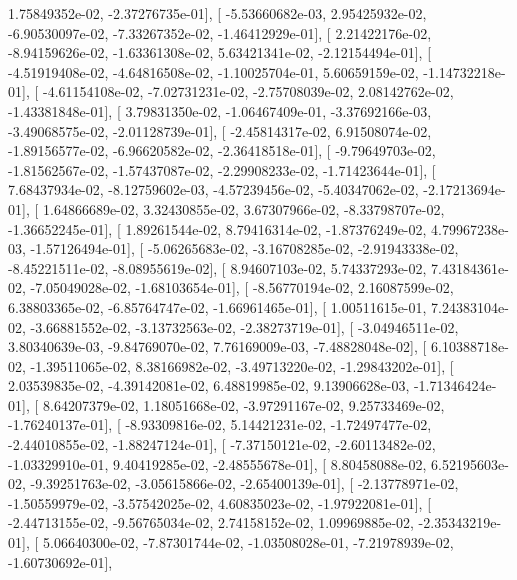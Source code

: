 \documentclass{article}
\begin{document}
          1.75849352e-02,  -2.37276735e-01],
       [ -5.53660682e-03,   2.95425932e-02,  -6.90530097e-02,
         -7.33267352e-02,  -1.46412929e-01],
       [  2.21422176e-02,  -8.94159626e-02,  -1.63361308e-02,
          5.63421341e-02,  -2.12154494e-01],
       [ -4.51919408e-02,  -4.64816508e-02,  -1.10025704e-01,
          5.60659159e-02,  -1.14732218e-01],
       [ -4.61154108e-02,  -7.02731231e-02,  -2.75708039e-02,
          2.08142762e-02,  -1.43381848e-01],
       [  3.79831350e-02,  -1.06467409e-01,  -3.37692166e-03,
         -3.49068575e-02,  -2.01128739e-01],
       [ -2.45814317e-02,   6.91508074e-02,  -1.89156577e-02,
         -6.96620582e-02,  -2.36418518e-01],
       [ -9.79649703e-02,  -1.81562567e-02,  -1.57437087e-02,
         -2.29908233e-02,  -1.71423644e-01],
       [  7.68437934e-02,  -8.12759602e-03,  -4.57239456e-02,
         -5.40347062e-02,  -2.17213694e-01],
       [  1.64866689e-02,   3.32430855e-02,   3.67307966e-02,
         -8.33798707e-02,  -1.36652245e-01],
       [  1.89261544e-02,   8.79416314e-02,  -1.87376249e-02,
          4.79967238e-03,  -1.57126494e-01],
       [ -5.06265683e-02,  -3.16708285e-02,  -2.91943338e-02,
         -8.45221511e-02,  -8.08955619e-02],
       [  8.94607103e-02,   5.74337293e-02,   7.43184361e-02,
         -7.05049028e-02,  -1.68103654e-01],
       [ -8.56770194e-02,   2.16087599e-02,   6.38803365e-02,
         -6.85764747e-02,  -1.66961465e-01],
       [  1.00511615e-01,   7.24383104e-02,  -3.66881552e-02,
         -3.13732563e-02,  -2.38273719e-01],
       [ -3.04946511e-02,   3.80340639e-03,  -9.84769070e-02,
          7.76169009e-03,  -7.48828048e-02],
       [  6.10388718e-02,  -1.39511065e-02,   8.38166982e-02,
         -3.49713220e-02,  -1.29843202e-01],
       [  2.03539835e-02,  -4.39142081e-02,   6.48819985e-02,
          9.13906628e-03,  -1.71346424e-01],
       [  8.64207379e-02,   1.18051668e-02,  -3.97291167e-02,
          9.25733469e-02,  -1.76240137e-01],
       [ -8.93309816e-02,   5.14421231e-02,  -1.72497477e-02,
         -2.44010855e-02,  -1.88247124e-01],
       [ -7.37150121e-02,  -2.60113482e-02,  -1.03329910e-01,
          9.40419285e-02,  -2.48555678e-01],
       [  8.80458088e-02,   6.52195603e-02,  -9.39251763e-02,
         -3.05615866e-02,  -2.65400139e-01],
       [ -2.13778971e-02,  -1.50559979e-02,  -3.57542025e-02,
          4.60835023e-02,  -1.97922081e-01],
       [ -2.44713155e-02,  -9.56765034e-02,   2.74158152e-02,
          1.09969885e-02,  -2.35343219e-01],
       [  5.06640300e-02,  -7.87301744e-02,  -1.03508028e-01,
         -7.21978939e-02,  -1.60730692e-01],
\end{document}
